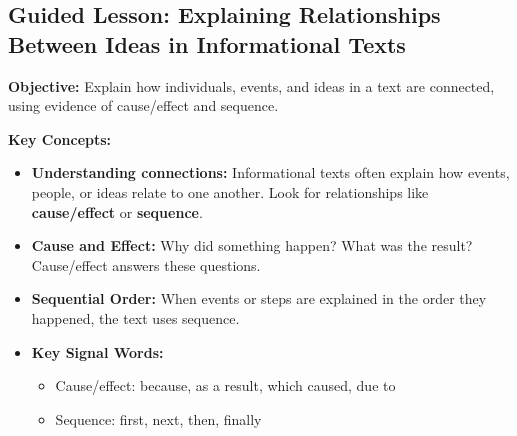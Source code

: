 \documentclass[12pt]{article}
\begin{document}
\subsection*{Guided Lesson: Explaining Relationships Between Ideas in Informational Texts}
\onehalfspacing

\begin{tcolorbox}[colframe=black!40, colback=gray!5, 
coltitle=black, colbacktitle=black!20, fonttitle=\bfseries\Large, 
title=Learning Objective, halign title=center, left=5pt, right=5pt, top=5pt, bottom=15pt]
\textbf{Objective:} Explain how individuals, events, and ideas in a text are connected, using evidence of cause/effect and sequence.
\end{tcolorbox}

\vspace{1em}

\begin{tcolorbox}[colframe=black!60, colback=white, 
coltitle=black, colbacktitle=black!15, fonttitle=\bfseries\Large, 
title=Key Concepts and Vocabulary, halign title=center, left=10pt, right=10pt, top=10pt, bottom=15pt]
\textbf{Key Concepts:}
\begin{itemize}
    \item \textbf{Understanding connections:} Informational texts often explain how events, people, or ideas relate to one another. Look for relationships like \textbf{cause/effect} or \textbf{sequence}.
    \item \textbf{Cause and Effect:} Why did something happen? What was the result? Cause/effect answers these questions.
    \item \textbf{Sequential Order:} When events or steps are explained in the order they happened, the text uses sequence.
    \item \textbf{Key Signal Words:}
    \begin{itemize}
        \item Cause/effect: because, as a result, which caused, due to
        \item Sequence: first, next, then, finally
    \end{itemize}
\end{itemize}
\end{tcolorbox}

\vspace{1em}
\end{document}

